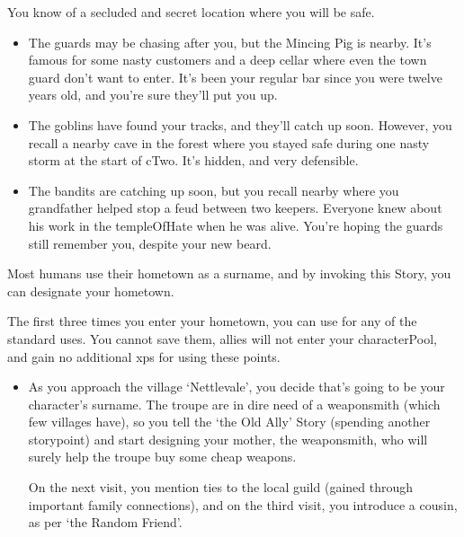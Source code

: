 \begin{multicols}{2}
You know of a secluded and secret location where you will be safe.

\begin{itemize}
  \item
  The guards may be chasing after you, but the Mincing Pig is nearby.  It's famous for some nasty customers and a deep cellar where even the town guard don't want to enter.
  It's been your regular bar since you were twelve years old, and you're sure they'll put you up.
  \item
  The goblins have found your tracks, and they'll catch up soon.
  However, you recall a nearby cave in the forest where you stayed safe during one nasty \gls{storm} at the start of \gls{cTwo}.
  It's hidden, and very defensible.
  \item
  The bandits are catching up soon, but you recall  nearby where you grandfather helped stop a feud between two \glspl{keeper}.
  Everyone knew about his work in the \gls{templeOfHate} when he was alive.
  You're hoping the guards still remember you, despite your new beard.
\end{itemize}

Most humans use their hometown as a surname, and by invoking this Story, you can designate your hometown.

The first three times you enter your hometown, you can use  for any of the standard uses.
You cannot save them, allies will not enter your \gls{characterPool}, and gain no additional \glspl{xp} for using these points.

\begin{itemize}
  \item
  As you approach the \gls{village} `Nettlevale', you decide that's going to be your character's surname.
  The troupe are in dire need of a weaponsmith (which few \glspl{village} have), so you tell the `the Old Ally' Story (spending another \gls{storypoint}) and start designing your mother, the weaponsmith, who will surely help the troupe buy some cheap weapons.

  On the next visit, you mention ties to the local guild (gained through important family connections), and on the third visit, you introduce a cousin, as per `the Random Friend'.
\end{itemize}

\end{multicols}
